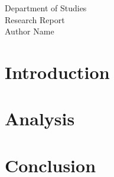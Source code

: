 \documentclass[12pt]{report}
\begin{document}
\begin{center}
    {\Large Department of Studies}\\
    \vspace{1em}
    {\Huge Research Report}\\
    \vspace{1em}
    Author Name
\end{center}

\vspace{2cm}

\chapter{Introduction}
\lipsum[1]

\chapter{Analysis}
\lipsum[2]

\chapter{Conclusion}
\lipsum[3]
\end{document}
